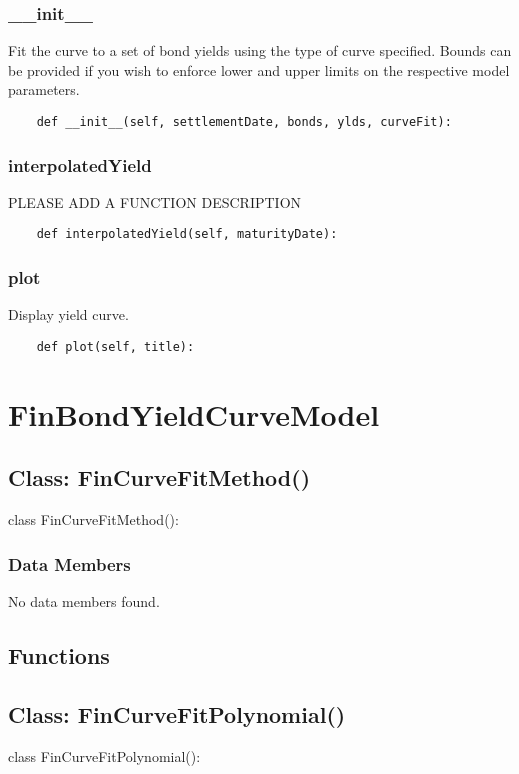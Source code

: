 \documentclass[twoside,11pt]{book}
\begin{document}
\subsubsection*{{\bf \_\_init\_\_}}
Fit the curve to a set of bond yields using the type of curve  specified. Bounds can be provided if you wish to enforce lower and  upper limits on the respective model parameters.  

\begin{lstlisting}
    def __init__(self, settlementDate, bonds, ylds, curveFit):
\end{lstlisting}

\subsubsection*{{\bf interpolatedYield}}
PLEASE ADD A FUNCTION DESCRIPTION

\begin{lstlisting}
    def interpolatedYield(self, maturityDate):
\end{lstlisting}

\subsubsection*{{\bf plot}}
Display yield curve.  

\begin{lstlisting}
    def plot(self, title):
\end{lstlisting}

\newpage
\section{FinBondYieldCurveModel}

\subsection*{Class: FinCurveFitMethod()}
class FinCurveFitMethod(): 

\subsubsection*{Data Members}
No data members found.

\subsection*{Functions}

\subsection*{Class: FinCurveFitPolynomial()}
class FinCurveFitPolynomial(): 
\end{document}
